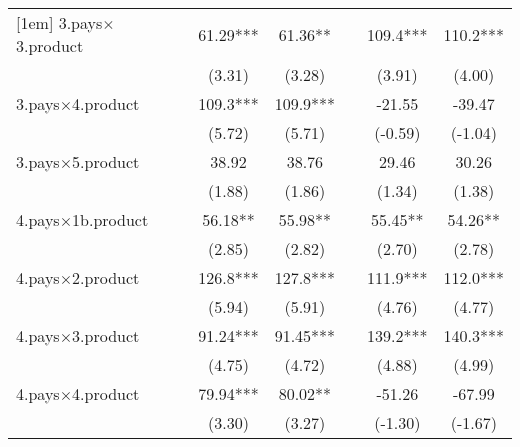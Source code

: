 {\begin{tabular}{l*{6}{c}}
[1em]
3.pays$\times$3.product    &                     &       61.29***&       61.36** &                     &       109.4***&       110.2***\\
                    &                     &      (3.31)         &      (3.28)         &                     &      (3.91)         &      (4.00)         \\
[1em]
3.pays$\times$4.product    &                     &       109.3***&       109.9***&                     &      -21.55         &      -39.47         \\
                    &                     &      (5.72)         &      (5.71)         &                     &     (-0.59)         &     (-1.04)         \\
[1em]
3.pays$\times$5.product    &                     &       38.92         &       38.76         &                     &       29.46         &       30.26         \\
                    &                     &      (1.88)         &      (1.86)         &                     &      (1.34)         &      (1.38)         \\
[1em]
4.pays$\times$1b.product   &                     &       56.18** &       55.98** &                     &       55.45** &       54.26** \\
                    &                     &      (2.85)         &      (2.82)         &                     &      (2.70)         &      (2.78)         \\
[1em]
4.pays$\times$2.product    &                     &       126.8***&       127.8***&                     &       111.9***&       112.0***\\
                    &                     &      (5.94)         &      (5.91)         &                     &      (4.76)         &      (4.77)         \\
[1em]
4.pays$\times$3.product    &                     &       91.24***&       91.45***&                     &       139.2***&       140.3***\\
                    &                     &      (4.75)         &      (4.72)         &                     &      (4.88)         &      (4.99)         \\
[1em]
4.pays$\times$4.product    &                     &       79.94***&       80.02** &                     &      -51.26         &      -67.99         \\
                    &                     &      (3.30)         &      (3.27)         &                     &     (-1.30)         &     (-1.67)         \\

\end{tabular}}
